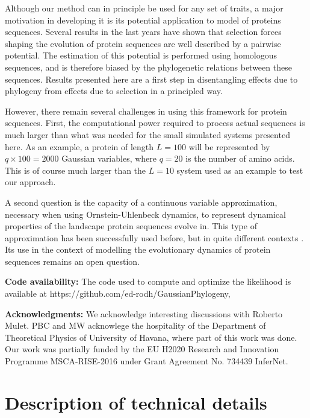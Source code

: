 \documentclass[preprint,amsmath,amssymb,superscriptaddress,showpacs,pre]{revtex4-1}
\begin{document}
Although our method can in principle be used for any set of traits, a major motivation in developing it is its potential application to model of proteins sequences. 
Several results in the last years have shown that selection forces shaping the evolution of protein sequences are well described by a pairwise potential. 
The estimation of this potential is performed using homologous sequences, and is therefore biased by the phylogenetic relations between these sequences.  
Results presented here are a first step in disentangling effects due to phylogeny from effects due to selection in a principled way. 

However, there remain several challenges in using this framework for protein sequences. 
First, the computational power required to process actual sequences is much larger than what was needed for the small simulated systems presented here. 
As an example, a protein of length $L=100$ will be represented by $q\times 100=2000$ Gaussian variables, where $q=20$ is the number of amino acids. 
This is of course much larger than the $L=10$ system used as an example to test our approach. 

A second question is the capacity of a continuous variable approximation, necessary when using Ornstein-Uhlenbeck dynamics, to represent dynamical properties of the landscape protein sequences evolve in. 
This type of approximation has been successfully used before, but in quite different contexts \cite{jones_psicov_2012,barton_large_2014,baldassi_fast_2014}. 
Its use in the context of modelling the evolutionary dynamics of protein sequences remains an open question. 

\textbf{Code availability:} The code used to compute and optimize the likelihood is available at https://github.com/ed-rodh/GaussianPhylogeny,

\textbf{Acknowledgments:} We acknowledge interesting discussions with Roberto Mulet. PBC and MW acknowlege the hospitality of the Department of  Theoretical  Physics of University  of  Havana, where part of this work was done. Our work was partially funded by the EU H2020 Research and Innovation Programme MSCA-RISE-2016 under Grant
Agreement No. 734439 InferNet.


\clearpage




\newpage
\appendix

\section{Description of technical details} %
\label{sec:supplementary_material}
\end{document}
